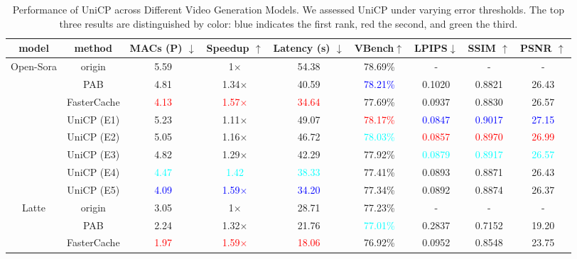 \begin{table*}[ht]
\centering
\caption{Performance of UniCP across Different Video Generation Models. We assessed UniCP under varying error thresholds. The top three results are distinguished by color: blue indicates the first rank, red the second, and green the third.}
\label{table:Comparison of efficiency and visual quality}

    \begin{tabular}{ccccccccc}
        \toprule
        model & method & MACs (P) $\downarrow$ & Speedup $\uparrow$ & Latency (s) $\downarrow$ & VBench$\uparrow$ & LPIPS$\downarrow$ & SSIM $\uparrow$ & PSNR $\uparrow$ \\ 
        \midrule
        \multirow{4}{*}{Open-Sora} 
        & origin & 5.59 & 1$\times$ & 54.38& 78.69\% & - & - & - \\
        & PAB \cite{zhao2024pab} & 4.81 & 1.34$\times$ & 40.59 & \textcolor{blue}{78.21\%} & 0.1020 & 0.8821 & 26.43 \\
        & FasterCache \cite{lv2024fastercache} &  \textcolor{red}{4.13} & \textcolor{red}{1.57$\times$} & \textcolor{red}{34.64} & 77.69\% & 0.0937 & 0.8830 & 26.57 \\
        \hline
        &UniCP (E1) & 5.23 & 1.11$\times$ & 49.07 & \textcolor{red}{78.17\%} & \textcolor{blue}{0.0847} & \textcolor{blue}{0.9017} & \textcolor{blue}{27.15} \\
        &UniCP (E2) &5.05&1.16$\times$&46.72&\textcolor{cyan}{78.03\%}&\textcolor{red}{0.0857}&\textcolor{red}{0.8970}&\textcolor{red}{26.99}\\
        &UniCP (E3) &4.82&1.29$\times$&42.29&77.92\%&\textcolor{cyan}{0.0879}&\textcolor{cyan}{0.8917}&\textcolor{cyan}{26.57}\\
        &UniCP (E4) &\textcolor{cyan}{4.47}&\textcolor{cyan}{1.42} &\textcolor{cyan}{38.33}&77.41\%&0.0893&0.8871&26.43\\
        &UniCP (E5) & \textcolor{blue}{4.09} & \textcolor{blue}{1.59$\times$} & \textcolor{blue}{34.20} & 77.34\% & 0.0892 & 0.8874 & 26.37 \\
        \midrule
        \multirow{4}{*}{Latte}
        & origin &3.05 & 1$\times$ & 28.71 & 77.23\% & - & - & - \\
        & PAB \cite{zhao2024pab} & 2.24 & 1.32$\times$ & 21.76 & \textcolor{cyan}{77.01\%} & 0.2837 & 0.7152 & 19.20 \\ 
        & FasterCache \cite{lv2024fastercache} & \textcolor{red}{1.97} & \textcolor{red}{1.59$\times$} & \textcolor{red}{18.06} & 76.92\% & 0.0952 & 0.8548 & 23.75 \\ 

\end{tabular}
\end{table*}
